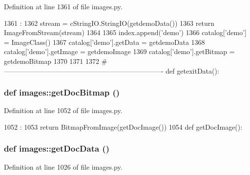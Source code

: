 Definition at line 1361 of file images.py.


\begin{DoxyCode}
1361                   :
1362     stream = cStringIO.StringIO(getdemoData())
1363     return ImageFromStream(stream)
1364 
1365 index.append('demo')
1366 catalog['demo'] = ImageClass()
1367 catalog['demo'].getData = getdemoData
1368 catalog['demo'].getImage = getdemoImage
1369 catalog['demo'].getBitmap = getdemoBitmap
1370 
1371 
1372 #----------------------------------------------------------------------
def getexitData():
\end{DoxyCode}
\hypertarget{namespaceimages_a7dd423f0aeac399629bb5bf6bc529cdf}{
\subsubsection[{getDocBitmap}]{\setlength{\rightskip}{0pt plus 5cm}def images::getDocBitmap ()}}
\label{namespaceimages_a7dd423f0aeac399629bb5bf6bc529cdf}


Definition at line 1052 of file images.py.


\begin{DoxyCode}
1052                   :
1053     return BitmapFromImage(getDocImage())
1054 
def getDocImage():
\end{DoxyCode}
\hypertarget{namespaceimages_a631eb8b7fd9b619029c58b8e38af8d17}{
\subsubsection[{getDocData}]{\setlength{\rightskip}{0pt plus 5cm}def images::getDocData ()}}
\label{namespaceimages_a631eb8b7fd9b619029c58b8e38af8d17}


Definition at line 1026 of file images.py.


